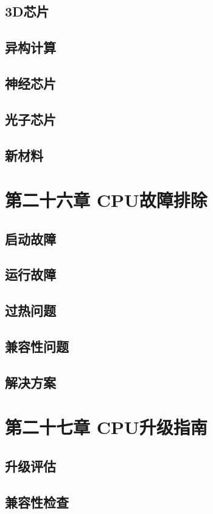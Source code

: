 \documentclass[12pt,UTF8]{ctexbook}
\begin{document}
\section{3D芯片}
\section{异构计算}
\section{神经芯片}
\section{光子芯片}
\section{新材料}

\chapter{第二十六章 CPU故障排除}

\section{启动故障}
\section{运行故障}
\section{过热问题}
\section{兼容性问题}
\section{解决方案}

\chapter{第二十七章 CPU升级指南}

\section{升级评估}
\section{兼容性检查}
\end{document}
